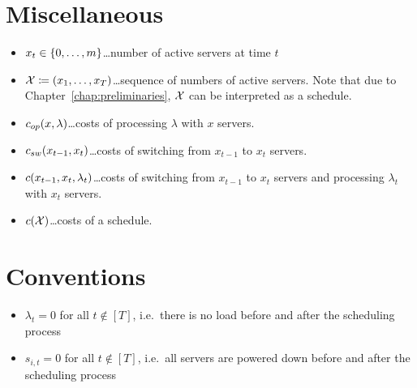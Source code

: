 \section*{Miscellaneous}
\begin{itemize}
	\item $x_t\in\{0,\dotsc,m\}$\ldots number of active servers at time $t$
	\item $\mathcal{X}\coloneqq(x_1,\ldots,x_T)$\ldots sequence of numbers of active servers. Note that due to Chapter~\ref{chap:preliminaries}, $\mathcal{X}$ can be interpreted as a schedule.
	\item $c_{op}(x,\lambda)$\ldots costs of processing $\lambda$ with $x$ servers.
	\item $c_{sw}(x_{t-1},x_{t})$\ldots costs of switching from $x_{t-1}$ to $x_t$ servers.
	\item $c(x_{t-1},x_{t},\lambda_t)$\ldots costs of switching from $x_{t-1}$ to $x_t$ servers and processing $\lambda_t$ with $x_t$ servers.
	\item $c(\mathcal{X})$\ldots costs of a schedule.
\end{itemize}

\section*{Conventions}
\begin{itemize}
	\item $\lambda_{t}=0$ for all $t\notin[T]$, i.e.\ there is no load before and after the scheduling process
	\item $s_{i,t}=0$ for all $t\notin[T]$, i.e.\ all servers are powered down before and after the scheduling process
\end{itemize}
